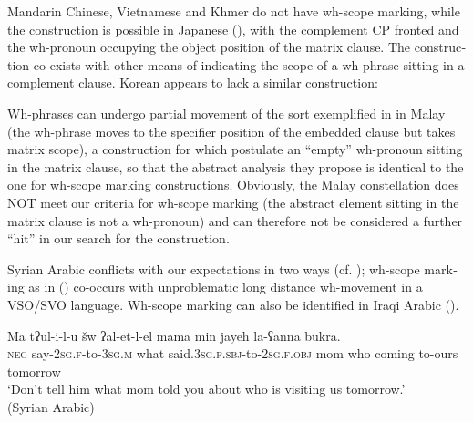 \documentclass[output=paper,colorlinks,citecolor=brown]{langscibook}
\begin{document}
\begin{otherlanguage}{english}
Mandarin Chinese, Vietnamese and Khmer do not have wh-scope marking, while the construction is possible in Japanese (\citealt{Fujiwara2021}), with the complement CP fronted and the wh-pronoun occupying the object position of the matrix clause. The construction co-exists with other means of indicating the scope of a wh-phrase sitting in a complement clause. Korean appears to lack a similar construction:

\ea \label{ex:fanselow:42}
    \label{ex:fanselow:42a}
    \label{ex:fanselow:42b}
    \z \z

\noindent Wh-phrases can undergo partial movement of the sort exemplified in  in Malay (the wh-phrase moves to the specifier position of the embedded clause but takes matrix scope), a construction for which \citet{Cole-Hermon1998} postulate an “emp\-ty” wh-pronoun sitting in the matrix clause, so that the abstract analysis they propose is identical to the one for wh-scope marking constructions. Obviously, the Malay constellation does NOT meet our criteria for wh-scope marking (the abstract element sitting in the matrix clause is not a wh-pronoun) and can therefore not be considered a further “hit” in our search for the construction.

Syrian Arabic conflicts with our expectations in two ways (cf. \citealt{Sulaiman2016}); wh-scope marking as in  (\citealt[141]{Sulaiman2016}) co-occurs with unproblematic long distance wh-movement in a VSO/SVO language. Wh-scope marking can also be identified in Iraqi Arabic (\citealt{Wahba1992}).

\ea 
\gll  Ma tʔul-i-l-u	šw	ʔal-et-l-el	mama	min	jayeh	la-ʕanna	bukra.  \\
       \textsc{neg} say-2\textsc{sg}.\textsc{f}-to-3\textsc{sg}.\textsc{m}	what	said.3\textsc{sg}.\textsc{f}.\textsc{sbj}-to-2\textsc{sg}.\textsc{f}.\textsc{obj}	mom	who	coming	to-ours   tomorrow  \\
    \glt    ‘Don’t tell him what mom told you about who is visiting us tomorrow.' \\\hfill (Syrian Arabic)\label{ex:fanselow:43}
    \z


\end{otherlanguage}
\end{document}
